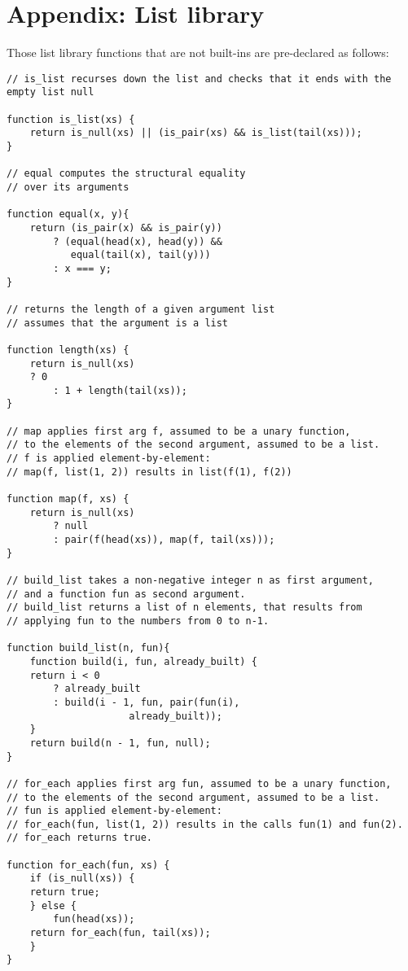 \section*{Appendix: List library}

Those list library functions that are not built-ins are pre-declared as follows:

\begin{lstlisting}
// is_list recurses down the list and checks that it ends with the empty list null

function is_list(xs) {
    return is_null(xs) || (is_pair(xs) && is_list(tail(xs)));
}

// equal computes the structural equality 
// over its arguments

function equal(x, y){
    return (is_pair(x) && is_pair(y)) 
        ? (equal(head(x), head(y)) &&
           equal(tail(x), tail(y)))
        : x === y;
}

// returns the length of a given argument list
// assumes that the argument is a list

function length(xs) {
    return is_null(xs) 
	? 0
        : 1 + length(tail(xs));
}

// map applies first arg f, assumed to be a unary function,
// to the elements of the second argument, assumed to be a list.
// f is applied element-by-element: 
// map(f, list(1, 2)) results in list(f(1), f(2))

function map(f, xs) {
    return is_null(xs)
        ? null
        : pair(f(head(xs)), map(f, tail(xs)));
}

// build_list takes a non-negative integer n as first argument,
// and a function fun as second argument.
// build_list returns a list of n elements, that results from 
// applying fun to the numbers from 0 to n-1.

function build_list(n, fun){
    function build(i, fun, already_built) {
	return i < 0
	    ? already_built
	    : build(i - 1, fun, pair(fun(i),
		  		     already_built));
    }
    return build(n - 1, fun, null);
}

// for_each applies first arg fun, assumed to be a unary function,
// to the elements of the second argument, assumed to be a list.
// fun is applied element-by-element:
// for_each(fun, list(1, 2)) results in the calls fun(1) and fun(2).
// for_each returns true.

function for_each(fun, xs) {
    if (is_null(xs)) {
	return true;
    } else {
        fun(head(xs));
	return for_each(fun, tail(xs));
    }
}


\end{lstlisting}

